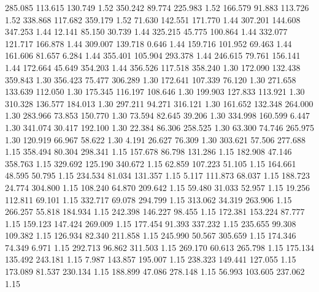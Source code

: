  285.085  113.615  130.749         1.52
 350.242   89.774  225.983         1.52
 166.579   91.883  113.726         1.52
 338.868  117.682  359.179         1.52
  71.630  142.551  171.770         1.44
 307.201  144.608  347.253         1.44
  12.141   85.150   30.739         1.44
 325.215   45.775  100.864         1.44
 332.077  121.717  166.878         1.44
 309.007  139.718    0.646         1.44
 159.716  101.952   69.463         1.44
 161.606   81.657    6.284         1.44
 355.401  105.904  293.378         1.44
 246.615   79.761  156.141         1.44
 172.664   45.649  354.203         1.44
 356.526  117.518  358.240         1.30
 172.090  132.438  359.843         1.30
 356.423   75.477  306.289         1.30
 172.641  107.339   76.120         1.30
 271.658  133.639  112.050         1.30
 175.345  116.197  108.646         1.30
 199.903  127.833  113.921         1.30
 310.328  136.577  184.013         1.30
 297.211   94.271  316.121         1.30
 161.652  132.348  264.000         1.30
 283.966   73.853  150.770         1.30
  73.594   82.645   39.206         1.30
 334.998  160.599    6.447         1.30
 341.074   30.417  192.100         1.30
  22.384   86.306  258.525         1.30
  63.300   74.746  265.975         1.30
 120.919   66.967   58.622         1.30
   4.191   26.627   76.309         1.30
 303.621   57.506  277.688         1.15
 358.494   80.304  298.341         1.15
 157.678   86.798  131.286         1.15
 182.908   47.146  358.763         1.15
 329.692  125.190  340.672         1.15
  62.859  107.223   51.105         1.15
 164.661   48.595   50.795         1.15
 234.534   81.034  131.357         1.15
   5.117  111.873   68.037         1.15
 188.723   24.774  304.800         1.15
 108.240   64.870  209.642         1.15
  59.480   31.033   52.957         1.15
  19.256  112.811   69.101         1.15
 332.717   69.078  294.799         1.15
 313.062   34.319  263.906         1.15
 266.257   55.818  184.934         1.15
 242.398  146.227   98.455         1.15
 172.381  153.224   87.777         1.15
 159.123  147.424  269.009         1.15
 177.454   91.393  337.232         1.15
 235.655   99.308  109.382         1.15
 126.934   82.340  211.858         1.15
 245.990   50.567  305.659         1.15
 174.346   74.349    6.971         1.15
 292.713   96.862  311.503         1.15
 269.170   60.613  265.798         1.15
 175.134  135.492  243.181         1.15
   7.987  143.857  195.007         1.15
 238.323  149.441  127.055         1.15
 173.089   81.537  230.134         1.15
 188.899   47.086  278.148         1.15
  56.993  103.605  237.062         1.15
